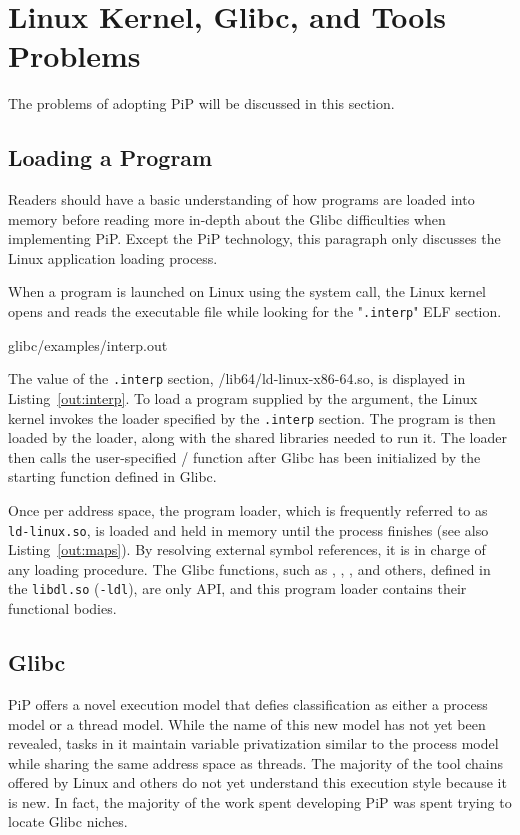 
\section{Linux Kernel, Glibc, and Tools Problems}

The problems of adopting PiP will be discussed in this section. 

\subsection{Loading a Program}

Readers should have a basic understanding of how programs are loaded
into memory before reading more in-depth about the Glibc difficulties
when implementing PiP. Except the PiP technology, this paragraph only
discusses the Linux application loading process.

When a program is launched on Linux using the 
system call, the Linux kernel opens and reads the executable file
while looking for the "{\tt .interp}" ELF section.

 {glibc/examples/interp.out}

The value of the {\tt .interp} section, /lib64/ld-linux-x86-64.so, is
displayed in Listing~\ref{out:interp}. To load a program supplied by
the  argument, the Linux kernel invokes the loader
specified by the {\tt .interp} section.
The program is then loaded by the loader, along with the shared
libraries needed to run it. The loader then calls the user-specified
\main/ function after Glibc has been initialized by the starting
function defined in Glibc.

Once per address space, the program loader, which is frequently
referred to as {\tt ld-linux.so}, is loaded and held in memory until
the process finishes (see also Listing~\ref{out:maps}). By resolving
external symbol references, it is in charge of any loading
procedure. The Glibc functions, such as ,
, , and others, defined in the
{\tt libdl.so} ({\tt -ldl}), are only API, and this program
loader contains their functional bodies.

\subsection{Glibc}

PiP offers a novel execution model that defies classification as
either a process model or a thread model. While the name of this new
model has not yet been revealed, tasks in it maintain variable
privatization similar to the process model while sharing the same
address space as threads. The majority of the tool chains offered by
Linux and others do not yet understand this execution style because it
is new. In fact, the majority of the work spent developing PiP was
spent trying to locate Glibc niches. 

